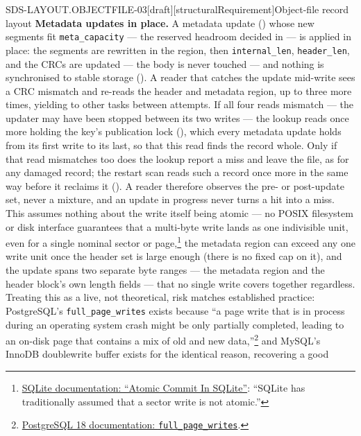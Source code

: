 \begin{requirement}{SDS-LAYOUT.OBJECTFILE-03}[draft][structuralRequirement]{Object-file record layout}
  \textbf{Metadata updates in place.} A metadata update
  () whose new segments fit
  \texttt{meta\_capacity} --- the reserved headroom decided in
   --- is applied in place: the segments
  are rewritten in the region, then \texttt{internal\_len},
  \texttt{header\_len}, and the CRCs are updated --- the body is never
  touched --- and nothing is synchronised to stable storage
  (). A reader that catches the update
  mid-write sees a CRC mismatch and re-reads the header and metadata region,
  up to three more times, yielding to other tasks between attempts. If all
  four reads mismatch --- the updater may have been stopped between its two
  writes --- the lookup reads once more holding the key's publication lock
  (), which every metadata update holds
  from its first write to its last, so that this read finds the record
  whole. Only if that read mismatches too does the lookup report a miss and
  leave the file, as for any damaged record; the restart scan reads such a
  record once more in the same way before it reclaims it
  (). A reader therefore observes
  the pre- or post-update set, never a mixture, and an update in progress
  never turns a hit into a miss. This assumes nothing about the write itself being atomic ---
  no POSIX filesystem or disk interface guarantees that a multi-byte write
  lands as one indivisible unit, even for a single nominal sector or
  page,\footnote{\href{https://www.sqlite.org/atomiccommit.html}{SQLite
  documentation: ``Atomic Commit In SQLite''}: ``SQLite has traditionally
  assumed that a sector write is not atomic.''} the metadata region can
  exceed any one write unit once the header set is large enough (there is
  no fixed cap on it), and the update spans two separate byte ranges ---
  the metadata region and the header block's own length fields --- that no
  single write covers together regardless. Treating this as a live, not
  theoretical, risk matches established practice: PostgreSQL's
  \texttt{full\_page\_writes} exists because ``a page write that is in
  process during an operating system crash might be only partially
  completed, leading to an on-disk page that contains a mix of old and new
  data,''\footnote{\href{https://www.postgresql.org/docs/18/runtime-config-wal.html\#GUC-FULL-PAGE-WRITES}{PostgreSQL
  18 documentation: \texttt{full\_page\_writes}}.} and MySQL's InnoDB
  doublewrite buffer exists for the identical reason, recovering a good

\end{requirement}
